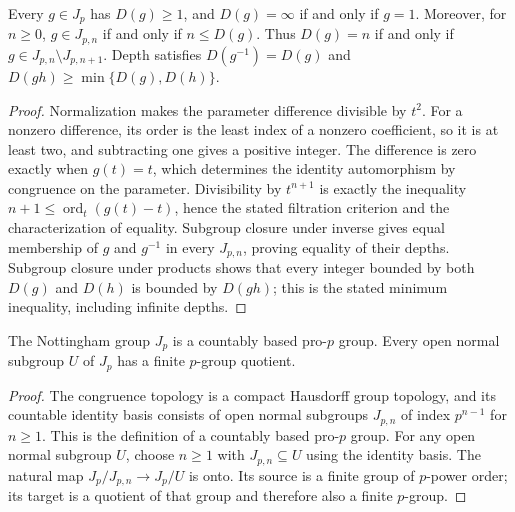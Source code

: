 \begin{lemma}
\label{lem:nottingham-depth-filtration}
\leanok
Every $g\in J_p$ has $D(g)\ge1$, and $D(g)=\infty$ if and only if
$g=1$. Moreover, for $n\ge0$, $g\in J_{p,n}$ if and only if
$n\le D(g)$. Thus $D(g)=n$ if and only if
$g\in J_{p,n}\setminus J_{p,n+1}$.
Depth satisfies $D(g^{-1})=D(g)$ and
$D(gh)\ge\min\{D(g),D(h)\}$.
\end{lemma}

\begin{proof}
Normalization makes the parameter difference divisible by $t^2$.
For a nonzero difference, its order is the least index of a nonzero
coefficient, so it is at least two, and subtracting one gives a
positive integer. The difference is zero exactly when $g(t)=t$,
which determines the identity automorphism by congruence on the parameter.
Divisibility by $t^{n+1}$ is exactly the inequality
$n+1\le\operatorname{ord}_t(g(t)-t)$, hence the stated filtration
criterion and the characterization of equality. Subgroup closure
under inverse gives equal membership of $g$ and $g^{-1}$ in every
$J_{p,n}$, proving equality of their depths. Subgroup closure under
products shows that every integer bounded by both $D(g)$ and $D(h)$
is bounded by $D(gh)$; this is the stated minimum inequality,
including infinite depths.
\end{proof}

\begin{lemma}
\label{lem:nottingham-pro-p}
\leanok
The Nottingham group $J_p$ is a countably based pro-$p$ group.
Every open normal subgroup $U$ of $J_p$ has a finite $p$-group quotient.
\end{lemma}

\begin{proof}
The congruence topology is a compact Hausdorff group topology, and
its countable identity basis consists of open normal subgroups
$J_{p,n}$ of index $p^{n-1}$ for $n\ge1$. This is the definition
of a countably based pro-$p$ group. For any open normal subgroup $U$,
choose $n\ge1$ with $J_{p,n}\subseteq U$ using the identity basis.
The natural map $J_p/J_{p,n}\longrightarrow J_p/U$ is onto.
Its source is a finite group of $p$-power order; its target is a
quotient of that group and therefore also a finite $p$-group.
\end{proof}

